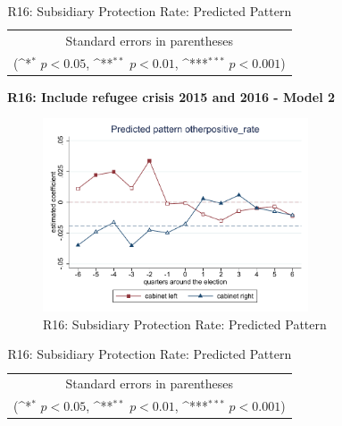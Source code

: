 \documentclass[10pt,a4paper]{scrartcl}
\begin{document}
\begin{table}[!ht]\centering
	\renewcommand{\arraystretch}{1.25}
	\def\sym#1{\ifmmode^{#1}\else\(^{#1}\)\fi}
	\caption{R16: Subsidiary Protection Rate: Predicted Pattern}
	\begin{tabular}{l*{2}{c}}
		\hline\hline
		
		\hline\hline
		\multicolumn{3}{c}{\footnotesize Standard errors in parentheses} \\
		\multicolumn{3}{c}{\footnotesize (\sym{*} \(p<0.05\), \sym{**} \(p<0.01\), \sym{***} \(p<0.001\))}\\
	\end{tabular}
\end{table}

\clearpage
\textbf{R16: Include refugee crisis 2015 and 2016 - Model 2}
\begin{figure}[!ht]
	\centering
	\includegraphics[width=0.7\textwidth]{figures_edited/otherpositive_rate_graph2_R16.pdf}
	\caption{R16: Subsidiary Protection Rate: Predicted Pattern}
\end{figure}

\begin{table}[!ht]\centering
	\footnotesize
	\renewcommand{\arraystretch}{1.2}
	\def\sym#1{\ifmmode^{#1}\else\(^{#1}\)\fi}
	\caption{R16: Subsidiary Protection Rate: Predicted Pattern}
	\begin{tabular}{l*{2}{c}}
		\hline\hline
		
		\hline\hline
		\multicolumn{3}{c}{\footnotesize Standard errors in parentheses} \\
		\multicolumn{3}{c}{\footnotesize (\sym{*} \(p<0.05\), \sym{**} \(p<0.01\), \sym{***} \(p<0.001\))} \\
	\end{tabular}
\end{table}
\end{document}
